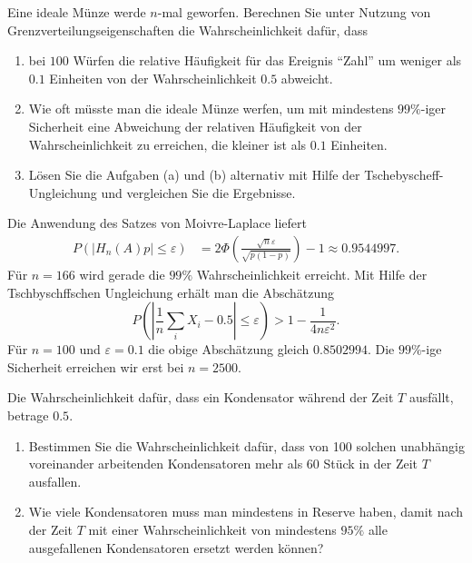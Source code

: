  Eine ideale Münze werde $n$-mal 
geworfen. Berechnen Sie unter Nutzung von Grenzverteilungseigenschaften die Wahrscheinlichkeit dafür, dass 
\begin{enumerate}
    \item bei $100$ Würfen die relative Häufigkeit für das Ereignis 
        ``Zahl'' um weniger als $0.1$ Einheiten von der Wahrscheinlichkeit
        $0.5$ abweicht.
    \item Wie oft müsste man die ideale Münze werfen, um mit mindestens
        $99\%$-iger Sicherheit eine Abweichung der relativen Häufigkeit
        von der Wahrscheinlichkeit zu erreichen, die kleiner ist als $0.1$
        Einheiten. 
    \item Lösen Sie die Aufgaben (a) und (b) alternativ mit Hilfe der Tschebyscheff-Ungleichung und vergleichen Sie die Ergebnisse. 
\end{enumerate}

\solution Die Anwendung des Satzes von Moivre-Laplace liefert
\begin{align*}
    P\left( | H_n(A) p | \leq \varepsilon \right) &= 
    2 \Phi\left ( \frac{\sqrt{n} \varepsilon}{ \sqrt{ p(1-p) }  } \right) -1 \approx 0.9544997.
\end{align*}
Für $n=166$ wird gerade die $99\%$ Wahrscheinlichkeit erreicht. Mit Hilfe der Tschbyschffschen
Ungleichung erhält man die Abschätzung
\begin{equation}
    P \left( | \frac{1}{n} \sum_{i}^{} X_i - 0.5 | \leq \varepsilon \right) > 1 - \frac{1}{4 n \varepsilon^2}.
\end{equation}
Für $n=100$ und $\varepsilon=0.1$ die obige Abschätzung gleich $0.8502994$. Die $99\%$-ige
Sicherheit erreichen wir erst bei $n=2500$. 

 Die Wahrscheinlichkeit dafür,
dass ein Kondensator während der Zeit $T$ ausfällt, betrage $0.5$. 
\begin{enumerate}
    \item Bestimmen Sie die Wahrscheinlichkeit dafür, dass von 100 solchen
        unabhängig voreinander arbeitenden Kondensatoren mehr als $60$ Stück in
        der Zeit $T$ ausfallen. 
    \item Wie viele Kondensatoren muss man mindestens in Reserve haben, damit
        nach der Zeit $T$ mit einer Wahrscheinlichkeit von mindestens $95\%$
        alle ausgefallenen Kondensatoren ersetzt werden können?
\end{enumerate}

